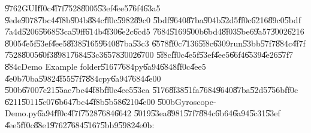 \documentclass[12pt,a4paper]{article}
\begin{document}
\U{9762}GUI\U{ff0c}\U{4f7f}\U{7528}\U{8005}\U{53ef}\U{4ee5}\U{76f4}\U{63a5}%
\U{9ede}\U{9078}\U{7bc4}\U{4f8b}\U{904b}\U{884c}\U{ff0c}\U{5982}\U{89c0}%
\U{5bdf}\U{9640}\U{87ba}\U{904b}\U{52d5}\U{ff0c}\U{6216}\U{89c0}\U{5bdf}%
\U{7a4d}\U{5206}\U{5668}\U{53ca}\U{59ff}\U{614b}\U{4f30}\U{6e2c}\U{6cd5}%
\U{7684}\U{5169}\U{500b}\U{6bd4}\U{8f03}\U{5be6}\U{9a57}\U{3002}\U{6216}%
\U{8005}\U{4e5f}\U{53ef}\U{4ee5}\U{8f38}\U{5165}\U{9640}\U{87ba}\U{53c3}%
\U{6578}\U{ff0c}\U{7136}\U{5f8c}\U{6309}run\U{53bb}\U{57f7}\U{884c}\U{4f7f}%
\U{7528}\U{8005}\U{60f3}\U{8981}\U{7684}\U{53c3}\U{6578}\U{3002}\U{6700}%
\U{5f8c}\U{ff0c}\U{4e5f}\U{53ef}\U{4ee5}\U{66f4}\U{6539}\U{4e26}\U{57f7}%
\U{884c}Demo Example folder\U{5167}\U{7684}py\U{6a94}\U{6848}\U{ff0c}\U{4ee5}%
\U{4e0b}\U{70ba}\U{5982}\U{4f55}\U{57f7}\U{884c}py\U{6a94}\U{7684}\U{4e00}%
\U{500b}\U{6700}\U{7c21}\U{55ae}\U{7bc4}\U{4f8b}\U{ff0c}\U{4ee5}\U{53ca}%
\U{5176}\U{8f38}\U{51fa}\U{7684}\U{9640}\U{87ba}\U{52d5}\U{756b}\U{ff0c}%
\U{6211}\U{5011}\U{5c07}\U{6b64}\U{7bc4}\U{4f8b}\U{5b58}\U{6210}\U{4e00}%
\U{500b}Gyroscope-Demo.py\U{6a94}\U{ff0c}\U{4f7f}\U{7528}\U{7684}\U{6642}%
\U{5019}\U{53ea}\U{8981}\U{57f7}\U{884c}\U{6b64}\U{6a94}\U{5c31}\U{53ef}%
\U{4ee5}\U{ff0c}\U{88e1}\U{9762}\U{7684}\U{5167}\U{5bb9}\U{5982}\U{4e0b}:

\bigskip

%
\begin{mdframed}[leftline=false, rightline=false,backgroundcolor=bg]
\inputminted[linenos,fontsize=\footnotesize]{python}{../../Scripts/cordtrans/Development_zone/Gyroscope-Demo-LatexImport.py}
\end{mdframed}%
\bigskip
\end{document}

